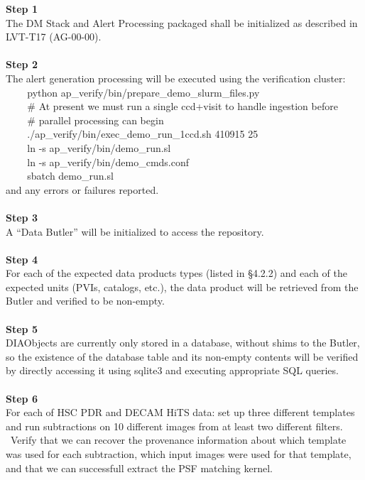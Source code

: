 \textbf{Step 1}\\
The DM Stack and Alert Processing packaged shall be initialized as
described in LVT-T17 (AG-00-00).\\
~\\
\textbf{Step 2}\\
The alert generation processing will be executed using the verification
cluster:\\
\hspace*{0.333em} ~ ~ ~python
ap\_verify/bin/prepare\_demo\_slurm\_files.py\\
\hspace*{0.333em} ~ ~ ~\# At present we must run a single ccd+visit to
handle ingestion before\\
\hspace*{0.333em} ~ ~ ~\# parallel processing can begin\\
\hspace*{0.333em} ~ ~ ~./ap\_verify/bin/exec\_demo\_run\_1ccd.sh 410915
25\\
\hspace*{0.333em} ~ ~ ~ln -s ap\_verify/bin/demo\_run.sl\\
\hspace*{0.333em} ~ ~ ~ln -s ap\_verify/bin/demo\_cmds.conf\\
\hspace*{0.333em} ~ ~ ~sbatch demo\_run.sl\\
and any errors or failures reported.\\
~\\
\textbf{Step 3}\\
A ``Data Butler'' will be initialized to access the repository.\\
~\\
\textbf{Step 4}\\
For each of the expected data products types (listed in §4.2.2) and each
of the expected units (PVIs, catalogs, etc.), the data product will be
retrieved from the Butler and verified to be non-empty.\\
~\\
\textbf{Step 5}\\
DIAObjects are currently only stored in a database, without shims to the
Butler, so the existence of the database table and its non-empty
contents will be verified by directly accessing it using sqlite3 and
executing appropriate SQL queries.\\
~\\
\textbf{Step 6}\\
For each of HSC PDR and DECAM HiTS data: set up three different
templates and run subtractions on 10 different images from at least two
different filters. ~Verify that we can recover the provenance
information about which template was used for each subtraction, which
input images were used for that template, and that we can successfull
extract the PSF matching kernel.\\
~\\

